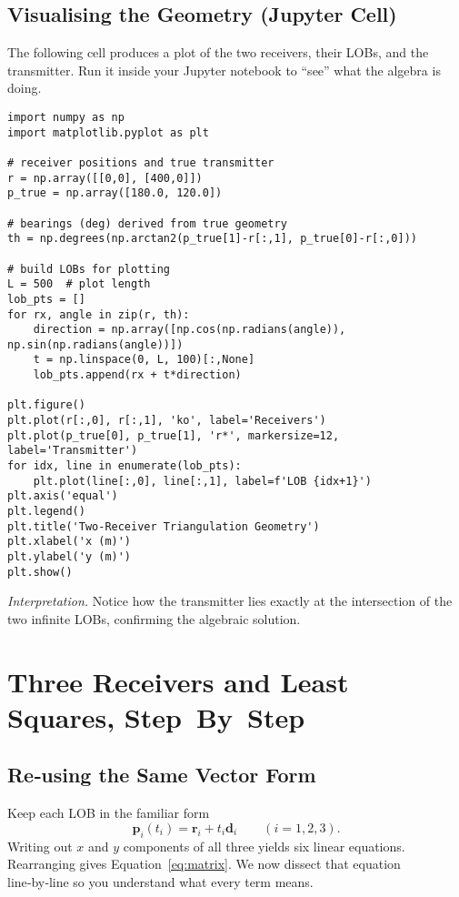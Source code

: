 \documentclass[11pt]{article}
\begin{document}
\subsection{Visualising the Geometry (Jupyter Cell)}
The following cell produces a plot of the two receivers, their LOBs, and the transmitter.  Run it inside your Jupyter notebook to “see” what the algebra is doing.
\begin{verbatim}
import numpy as np
import matplotlib.pyplot as plt

# receiver positions and true transmitter
r = np.array([[0,0], [400,0]])
p_true = np.array([180.0, 120.0])

# bearings (deg) derived from true geometry
th = np.degrees(np.arctan2(p_true[1]-r[:,1], p_true[0]-r[:,0]))

# build LOBs for plotting
L = 500  # plot length
lob_pts = []
for rx, angle in zip(r, th):
    direction = np.array([np.cos(np.radians(angle)), np.sin(np.radians(angle))])
    t = np.linspace(0, L, 100)[:,None]
    lob_pts.append(rx + t*direction)

plt.figure()
plt.plot(r[:,0], r[:,1], 'ko', label='Receivers')
plt.plot(p_true[0], p_true[1], 'r*', markersize=12, label='Transmitter')
for idx, line in enumerate(lob_pts):
    plt.plot(line[:,0], line[:,1], label=f'LOB {idx+1}')
plt.axis('equal')
plt.legend()
plt.title('Two-Receiver Triangulation Geometry')
plt.xlabel('x (m)')
plt.ylabel('y (m)')
plt.show()
\end{verbatim}
\noindent\emph{Interpretation.}  Notice how the transmitter lies exactly at the intersection of the two infinite LOBs, confirming the algebraic solution.

\section{Three Receivers and Least Squares, Step By Step}
\subsection{Re‑using the Same Vector Form}
Keep each LOB in the familiar form
\[\mathbf p_i(t_i)=\mathbf r_i+t_i\mathbf d_i\qquad(i=1,2,3).\]
Writing out $x$ and $y$ components of all three yields six linear equations.  Rearranging gives Equation~\eqref{eq:matrix}.  We now dissect that equation line‑by‑line so you understand what every term means.

\end{document}
